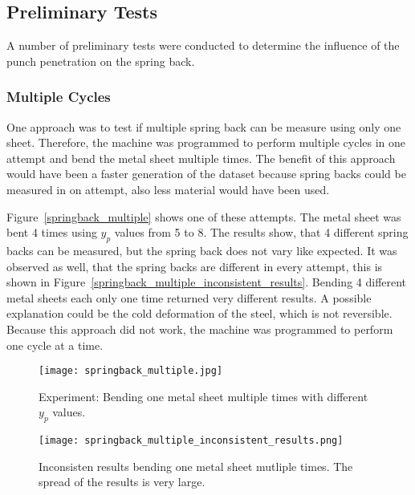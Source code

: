 \subsection{Preliminary Tests}
A number of preliminary tests were conducted to determine the influence of the punch penetration on the spring back.

\subsubsection{Multiple Cycles}
One approach was to test if multiple spring back can be measure using only one sheet.
Therefore, the machine was programmed to perform multiple cycles in one attempt and bend the metal sheet multiple times. The benefit of this approach would have been a faster generation of the dataset because spring backs could be measured in on attempt, also less material would have been used.

Figure~\ref{springback_multiple} shows one of these attempts. The metal sheet was bent 4 times using $y_p$ values from 5 to 8. The results show, that 4 different spring backs can be measured, but the spring back does not vary like expected. It was observed as well, that the spring backs are different in every attempt, this is shown in Figure~\ref{springback_multiple_inconsistent_results}.
Bending 4 different metal sheets each only one time returned very different results.
A possible explanation could be the cold deformation of the steel, which is not reversible. Because this approach did not work, the machine was programmed to perform one cycle at a time.

\captionsetup{width=0.45\textwidth}

\begin{figure}[H]
    \centering
    \begin{minipage}[b]{0.5\textwidth}
        \centering
        \texttt{[image: springback\_multiple.jpg]} %
        \caption{Experiment: Bending one metal sheet multiple times with different $y_p$ values.}
        \label{springback_multiple}
    \end{minipage}\hfill
    \begin{minipage}[b]{0.5\textwidth}
        \centering
        \texttt{[image: springback\_multiple\_inconsistent\_results.png]} %
        \caption{Inconsisten results bending one metal sheet mutliple times. The spread of the results is very large.}
        \label{springback_multiple_inconsistent_results}
    \end{minipage}
    \label{fig:springback_multiple_overview}
\end{figure}

